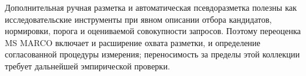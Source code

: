 \documentclass[runningheads,a4paper]{llncs}
\begin{document}
Дополнительная ручная разметка и автоматическая псевдоразметка полезны как исследовательские инструменты при явном описании отбора кандидатов, нормировки, порога и оцениваемой совокупности запросов. Поэтому переоценка MS MARCO включает и расширение охвата разметки, и определение согласованной процедуры измерения; переносимость за пределы этой коллекции требует дальнейшей эмпирической проверки.


\clearpage

\end{document}
